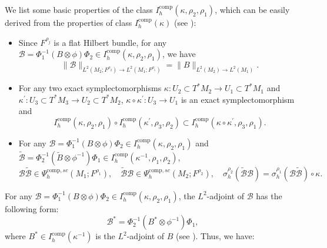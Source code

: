 \documentclass[11pt,oneside,reqno]{amsart}
\theoremstyle{definition}
\numberwithin{equation}{section}
\theoremstyle{plain}
\begin{document}
We list some basic properties of the class $I^{\mathrm{comp}}_h(\kappa,\rho_2,\rho_1)$, which can be easily derived from the properties of class $I_{h}^{\mathrm{comp}}(\kappa)$ (see \cite[\S 2.2]{dyatlovzahl2016spectral}):
\begin{itemize}
    \item Since $F^{\rho_{j}}$ is a flat Hilbert bundle, for any $\mathcal{B} =\Phi_{1}^{-1}(B \otimes \phi)\Phi_{2}\in I_{h}^{\mathrm{comp}}(\kappa,\rho_{2},\rho_{1})$, we have
    \begin{equation}\label{operatornormoffio}
\| \mathcal{B}\|_{L^2(M_2;F^{\rho_2})\to L^2(M_1;F^{\rho_1})}=\|B\|_{L^2(M_2)\to L^2(M_1)}.
\end{equation}
\item For any two exact symplectomorphisms $\kappa: U_{2}\subset T^*M_2 \to U_{1}\subset T^*M_{1}$ and $\kappa^{\prime}: U_{3}\subset T^*M_3 \to U_{2}\subset T^*M_{2}$, $\kappa \circ \kappa^{\prime}: U_{3} \to U_{1}$ is an exact symplectomorphism and
\begin{equation}
    I_{h}^{\mathrm{comp}}(\kappa,\rho_{2},\rho_{1})\circ I_{h}^{\mathrm{comp}}(\kappa^{\prime},\rho_{3},\rho_{2}) \subset  I_{h}^{\mathrm{comp}}(\kappa\circ \kappa^{\prime},\rho_{3},\rho_{1}).
\end{equation} 
\item For any $\mathcal{B}=\Phi_{1}^{-1}(B\otimes \phi)\Phi_{2} \in I^{\mathrm{comp}}_h(\kappa,\rho_2,\rho_1)$ and $\widetilde{\mathcal{B}}=\Phi_{2}^{-1}(\widetilde{B}\otimes \phi^{-1})\Phi_{1} \in I^{\mathrm{comp}}_h(\kappa^{-1},\rho_1,\rho_2)$, 
\begin{equation}
    \mathcal{B}\widetilde{\mathcal{B}}\in \Psi_{h}^{\mathrm{comp},sc}(M_{1};F^{\rho_{1}}), \quad \widetilde{\mathcal{B}}\mathcal{B}\in \Psi_{h}^{\mathrm{comp},sc}(M_{2};F^{\rho_{2}}), \quad \sigma_{h}^{\rho_{2}}(\widetilde{\mathcal{B}}\mathcal{B})=\sigma^{\rho_{1}}_{h}(\mathcal{B}\widetilde{\mathcal{B}})\circ \kappa.
\end{equation}
\end{itemize}

For any $\mathcal{B}=\Phi_{1}^{-1}(B\otimes \phi)\Phi_{2} \in I_{h}^{\mathrm{comp}}(\kappa,\rho_{2},\rho_{1})$, the $L^2$-adjoint of $\mathcal{B}$ has the following form:
\begin{equation*}
    \mathcal{B}^*=\Phi_{2}^{-1}(B^*\otimes \phi^{-1})\Phi_{1},
\end{equation*}
where $B^* \in I^{\mathrm{comp}}_h(\kappa^{-1})$ is the $L^2$-adjoint of $B$ (see \cite[\S 2.2]{dyatlovzahl2016spectral}). Thus, we have:
\end{document}
